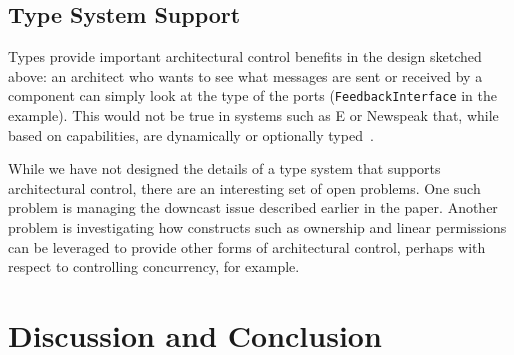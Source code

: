 \documentclass[runningheads]{llncs}
\begin{document}
\begin{sloppypar}



\subsection{Type System Support}

Types provide important architectural control benefits in the design sketched above: an architect who wants to see what messages are sent or received by a component can simply look at the type of the ports (\texttt{FeedbackInterface} in the example).  This would not be true in systems such as E or Newspeak that, while based on capabilities, are dynamically or optionally typed~\cite{MarkMiller-E,BrachaNewspeakModules}.

While we have not designed the details of a type system that supports architectural control, there are an interesting set of open problems.  One such problem is managing the downcast issue described earlier in the paper.  Another problem is investigating how constructs such as ownership and linear permissions can be leveraged to provide other forms of architectural control, perhaps with respect to controlling concurrency, for example.


\section{Discussion and Conclusion}


\end{sloppypar}
\end{document}
